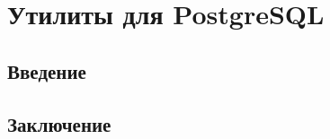 \chapter{Утилиты для PostgreSQL}

\begin{epigraphs}
\end{epigraphs}

\section{Введение}





\section{Заключение}
